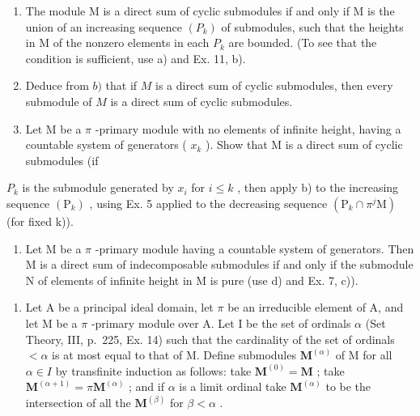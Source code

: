 \begin{enumerate}
\def\labelenumi{\alph{enumi})}
\setcounter{enumi}{1}
\item
  The module M is a direct sum of cyclic submodules if and only if M is the union of an increasing sequence \((P_{k})\) of submodules, such that the heights in M of the nonzero elements in each \(P_{k}\) are bounded. (To see that the condition is sufficient, use a) and Ex. 11, b).
\item
  Deduce from \(b)\) that if \(M\) is a direct sum of cyclic submodules, then every submodule of \(M\) is a direct sum of cyclic submodules.
\item
  Let M be a \(\pi\) -primary module with no elements of infinite height, having a countable system of generators ( \(x_{k}\) ). Show that M is a direct sum of cyclic submodules (if
\end{enumerate}

\(P_{k}\) is the submodule generated by \(x_{i}\) for \(i \leqslant k\) , then apply b) to the increasing sequence \((\mathrm{P}_{k})\) , using Ex. 5 applied to the decreasing sequence \((\mathrm{P}_{k} \cap \pi^{j}\mathrm{M})\) (for fixed k)).

\begin{enumerate}
\def\labelenumi{\alph{enumi})}
\setcounter{enumi}{4}
\tightlist
\item
  Let M be a \(\pi\) -primary module having a countable system of generators. Then M is a direct sum of indecomposable submodules if and only if the submodule N of elements of infinite height in M is pure (use d) and Ex. 7, c)).
\end{enumerate}

\begin{enumerate}
\def\labelenumi{\arabic{enumi})}
\setcounter{enumi}{12}
\tightlist
\item
  Let A be a principal ideal domain, let \(\pi\) be an irreducible element of A, and let M be a \(\pi\) -primary module over A. Let I be the set of ordinals \(\alpha\) (Set Theory, III, p.~225, Ex. 14) such that the cardinality of the set of ordinals \(< \alpha\) is at most equal to that of M. Define submodules \(\mathbf{M}^{(\alpha)}\) of M for all \(\alpha \in I\) by transfinite induction as follows: take \(\mathbf{M}^{(0)} = \mathbf{M}\) ; take \(\mathbf{M}^{(\alpha + 1)} = \pi \mathbf{M}^{(\alpha)}\) ; and if \(\alpha\) is a limit ordinal take \(\mathbf{M}^{(\alpha)}\) to be the intersection of all the \(\mathbf{M}^{(\beta)}\) for \(\beta < \alpha\) .
\end{enumerate}

